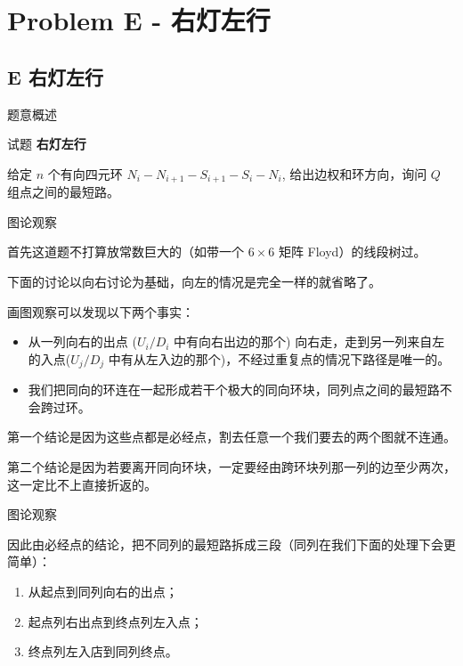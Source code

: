 \documentclass{beamer}
\newcommand{\TT}[1] {{\ttfamily #1}}
\newcommand{\BF}[1] {\textbf{#1}}
\begin{document}
{

\section[E]{Problem E - 右灯左行}
\subsection{E 右灯左行}

\begin{frame}{题意概述}

\begin{center}
试题 \myboxv{      \BF{\TT{E}}} \BF{右灯左行}
\end{center}

给定 $n$ 个有向四元环 $N_i - N_{i + 1} - S_{i + 1} - S_i - N_i$, 给出边权和环方向，询问 $Q$ 组点之间的最短路。


\end{frame}


\begin{frame}{图论观察}
  
首先这道题不打算放常数巨大的（如带一个 $6 \times 6$ 矩阵 Floyd）的线段树过。

下面的讨论以向右讨论为基础，向左的情况是完全一样的就省略了。

画图观察可以发现以下两个事实：

\begin{itemize}
  \item 从一列向右的出点 ($U_i/D_i$ 中有向右出边的那个) 向右走，走到另一列来自左的入点($U_j/D_j$ 中有从左入边的那个)，不经过重复点的情况下路径是唯一的。
  \item 我们把同向的环连在一起形成若干个极大的同向环块，同列点之间的最短路不会跨过环。
\end{itemize}

第一个结论是因为这些点都是必经点，割去任意一个我们要去的两个图就不连通。

第二个结论是因为若要离开同向环块，一定要经由跨环块列那一列的边至少两次，这一定比不上直接折返的。



\end{frame}

\begin{frame}{图论观察}
  
因此由必经点的结论，把不同列的最短路拆成三段（同列在我们下面的处理下会更简单）：

\begin{enumerate}
  \item 从起点到同列向右的出点；
  \item 起点列右出点到终点列左入点；
  \item 终点列左入店到同列终点。
\end{enumerate}



\end{frame}}
\end{document}
